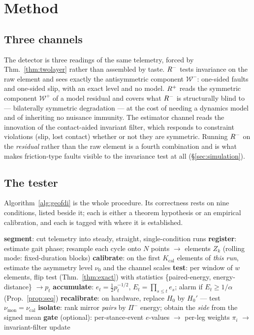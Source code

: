 \section{Method}
\label{sec:method}

\subsection{Three channels}

The detector is three readings of the same telemetry, forced by Thm.~\ref{thm:twolayer} rather than assembled by taste.
$R^{-}$ tests invariance on the raw element and sees exactly the antisymmetric component $\mathcal{W}^-$: one-sided
faults and one-sided slip, with an exact level and no model. $R^{+}$ reads the symmetric component $\mathcal{W}^+$ of a
model residual and covers what $R^{-}$ is structurally blind to --- bilaterally symmetric degradation --- at the cost
of needing a dynamics model and of inheriting no nuisance immunity. The estimator channel reads the innovation of the
contact-aided invariant filter, which responds to constraint violations (slip, lost contact) whether or not they are
symmetric. Running $R^{-}$ on the \emph{residual} rather than the raw element is a fourth combination and is what
makes friction-type faults visible to the invariance test at all (\S\ref{sec:simulation}).

\subsection{The tester}

Algorithm~\ref{alg:geofdi} is the whole procedure. Its correctness rests on nine conditions, listed beside it; each is
either a theorem hypothesis or an empirical calibration, and each is tagged with where it is established.

\begin{algorithm}[t]
\caption{GeoFDI tester (one session)}
\label{alg:geofdi}
\begin{algorithmic}[1]
\State \textbf{segment}: cut telemetry into steady, straight, single-condition runs
\State \textbf{register}: estimate gait phase; resample each cycle onto $N$ points $\rightarrow$ elements $Z_k$
       (rolling mode: fixed-duration blocks)
\State \textbf{calibrate}: on the first $K_{\mathrm{cal}}$ elements of \emph{this run}, estimate the asymmetry level
       $\nu_0$ and the channel scales
\State \textbf{test}: per window of $w$ elements, flip test (Thm.~\ref{thm:exact}) with statistics
       \{paired-energy, energy-distance\} $\rightarrow p_t$
\State \textbf{accumulate}: $e_t\!=\!\tfrac12p_t^{-1/2}$, $E_t\!=\!\prod_{s\le t}e_s$; alarm if $E_t\ge1/\alpha$
       (Prop.~\ref{prop:seq})
\State \textbf{recalibrate}: on hardware, replace $H_0$ by $H_0'$ --- test $\nu_{\mathrm{mon}}\!=\!\nu_{\mathrm{cal}}$
\State \textbf{isolate}: rank mirror \emph{pairs} by $\Pi^-$ energy; obtain the \emph{side} from the signed mean
\State \textbf{gate} (optional): per-stance-event $e$-values $\rightarrow$ per-leg weights $\pi_i$ $\rightarrow$
       invariant-filter update
\end{algorithmic}
\end{algorithm}

